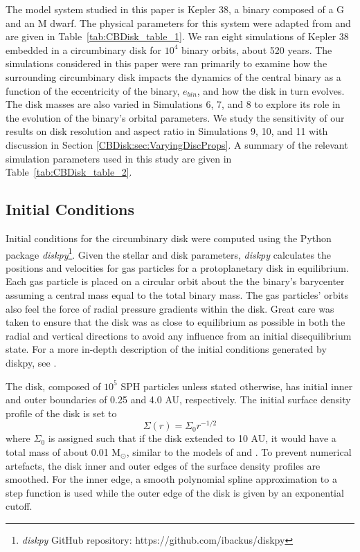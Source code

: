The model system studied in this paper is Kepler 38, a binary composed of a G and an M dwarf.  The physical parameters for this 
system were adapted from \citet{Orosz2012} and are given in Table~\ref{tab:CBDisk_table_1}.  We ran eight simulations of Kepler 38 embedded in a 
circumbinary disk for $10^4$ binary orbits, about 520 years.  The simulations considered in this paper were ran primarily to examine how 
the surrounding circumbinary disk impacts the dynamics of the central
binary as a function of the eccentricity of the binary, $e_{bin}$, and
how the disk in turn evolves.  The disk masses are also varied in Simulations 6, 7, and 8 to explore its role in the evolution of the binary's orbital parameters.  
We study the sensitivity of our results on disk resolution and aspect ratio in Simulations 9, 10, and 11 with discussion in Section 
\ref{CBDisk:sec:VaryingDiscProps}.  A summary of the relevant simulation parameters used in this study are given in Table~\ref{tab:CBDisk_table_2}. 

\subsection{Initial Conditions}

Initial conditions for the circumbinary disk were computed using the
Python package {\em diskpy}\footnote{{\em diskpy} GitHub repository: https://github.com/ibackus/diskpy}.  
Given the stellar and disk parameters, {\em diskpy}
calculates the positions and velocities for gas particles for a
protoplanetary disk in equilibrium.   Each gas particle is placed on a
circular orbit about the the binary's barycenter assuming a central
mass equal to the total binary mass.  
The gas particles' orbits also feel the force of radial pressure gradients within the disk.  Great care was taken to ensure that the disk
was as close to equilibrium as possible in both the radial and vertical directions to avoid any influence from an initial disequilibrium
state.  For a more in-depth description of the initial conditions generated by diskpy, see \citet{Backus2016}.

The disk, composed of $10^5$ SPH particles unless stated otherwise, has initial inner and outer boundaries of 0.25 and 4.0 AU,
respectively.  The initial surface density profile of the disk is set to 
\begin{equation}
\Sigma(r) = \Sigma_0 r^{-1/2}
\end{equation}
 where $\Sigma_0$ is assigned such that if the disk extended to 10 AU, it would have a total mass of about 0.01 
M$_{\odot}$, similar to the models of \citet{Pierens2007} and \citet{Kley2014}.  To prevent numerical 
artefacts, the disk inner and outer edges of the surface density profiles are smoothed.  For the inner edge, a smooth polynomial spline approximation to a step function is used while the outer edge of the disk is given by an exponential cutoff.
 
